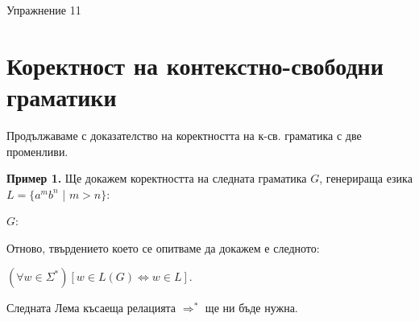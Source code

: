 \documentclass{article}
\begin{document}
\begin{center}
    {\huge Упражнение 11}
\end{center}

\vspace{15pt}

\section{Коректност на контекстно-свободни граматики}
    \hspace{15pt} Продължаваме с доказателство на коректността на к-св. граматика с две променливи.

    \vspace{15pt}

    \textbf{Пример 1.} Ще докажем коректността на следната граматика $G$, генерираща 
    езика $L = \{a^mb^n$ | $m > n\}$: \\
    \begin{center}
        $G$: 
    \end{center}

    Отново, твърдението което се опитваме да докажем е следното: \\
    \begin{center}
        $(\forall w \in \Sigma^*)[w \in L(G) \iff w \in L]$.
    \end{center}

    Следната Лема късаеща релацията $\Rightarrow^*$ ще ни бъде нужна. \\

    \vspace{5pt}
    
\end{document}
